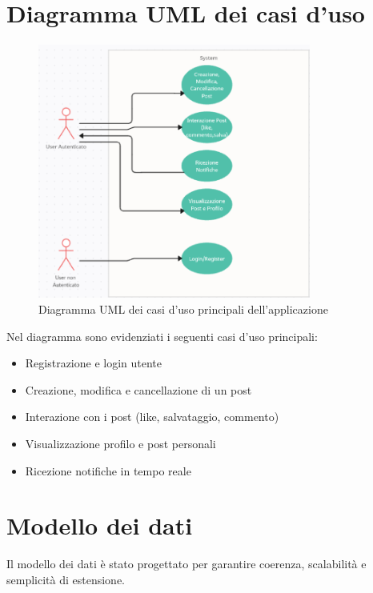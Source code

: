 \documentclass[a4paper,12pt]{article}
\begin{document}
\section{Diagramma UML dei casi d’uso}
\begin{figure}[h!]
    \centering
    \includegraphics[width=0.8\textwidth]{usecase.png}
    \caption{Diagramma UML dei casi d’uso principali dell’applicazione}
    \label{fig:usecase}
\end{figure}

\noindent
Nel diagramma sono evidenziati i seguenti casi d’uso principali:
\begin{itemize}
    \item Registrazione e login utente
    \item Creazione, modifica e cancellazione di un post
    \item Interazione con i post (like, salvataggio, commento)
    \item Visualizzazione profilo e post personali
    \item Ricezione notifiche in tempo reale
\end{itemize}

\section{Modello dei dati}
Il modello dei dati è stato progettato per garantire coerenza, scalabilità e semplicità di estensione.
\end{document}

